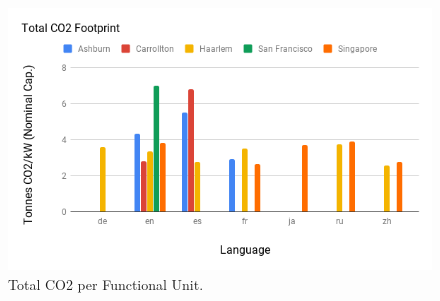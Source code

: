 \begin{figure}[h!]\centering
    \includegraphics[scale=0.65]{embodied_cost_model/images/Total CO2 Footprint.png}
    \caption[Total CO2 per Functional Unit]{Total CO2 per Functional Unit.}
    \label{img: total_co2}
\end{figure}